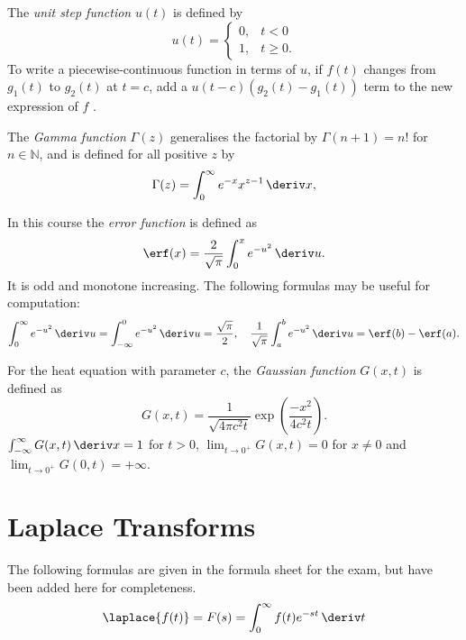 \documentclass[10pt, a4paper]{article}
\begin{document}
\begin{landscape}
\begin{multicols}{2}
    The \emph{unit step function} \(u(t)\) is defined by
    \[
        u(t) = \begin{cases}
            0, & t < 0 \\
            1, & t \geq 0.
        \end{cases}  
    \]
    To write a piecewise-continuous function in terms of \(u\),
    if \(f(t)\) changes from \(g_1(t)\) to \(g_2(t)\) at \(t = c\), add a \(u(t-c) (g_2(t) - g_1(t))\) term
    to the new expression of \(f\) \cite{LaplacePractice}.

    The \emph{Gamma function} \(\Gamma(z)\) generalises the factorial by
    \(\Gamma(n + 1) = n!\) for \(n \in \mathbb{N}\), and is defined for all positive \(z\) by
    \[
        \Gamma(z) = \int_0^{\infty} e^{-x} x^{z-1} \,\deriv x,
    \]

    In this course the \emph{error function} is defined as
    \[
        \erf(x) = \frac{2}{\sqrt{\pi}} \int_0^x e^{-u^2} \,\deriv u.
    \]
    It is odd and monotone increasing. The following formulas may be useful for computation:
    \[
        \int_0^{\infty} e^{-u^2} \,\deriv u = \int_{-\infty}^{0} e^{-u^2} \,\deriv u
        = \frac{\sqrt{\pi}}{2},
        \quad
        \frac{1}{\sqrt{\pi}} \int_a^b e^{-u^2} \,\deriv u
        = \erf(b) - \erf(a).
    \]

    For the heat equation with parameter \(c\), the \emph{Gaussian function} \(G(x, t)\) is defined as
    \[
        G(x, t) = \frac{1}{\sqrt{4 \pi c^2 t}} \exp \left(
            \frac{-x^2}{4c^2 t}
        \right).
    \]
    \(\int_{-\infty}^{\infty} G(x, t) \,\deriv x = 1\) for \(t > 0\),
    \(\lim_{t \to 0^+} G(x, t) = 0\) for \(x \neq 0\) and
    \(\lim_{t \to 0^+} G(0, t) = +\infty\).

    \section{Laplace Transforms}

    The following formulas are given in the formula sheet for the exam, but have been
    added here for completeness.
    \[
        \laplace\{f(t)\} = F(s) = \int_0^{\infty} f(t) e^{-st} \,\deriv t
    \]


\end{multicols}
\end{landscape}
\end{document}
